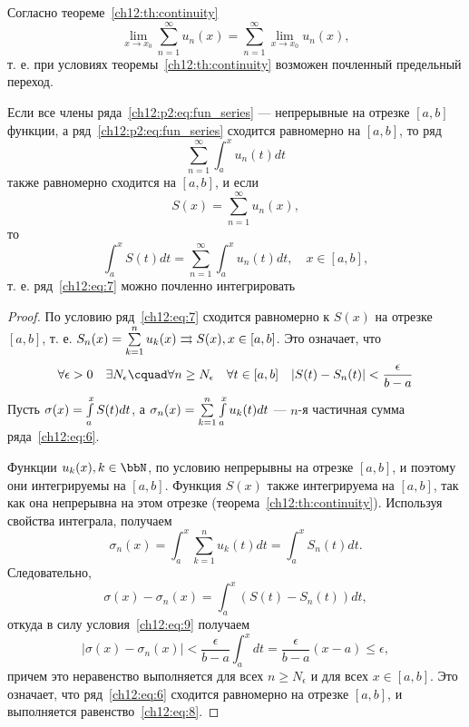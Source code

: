 \begin{cons}
	Согласно теореме~\ref{ch12:th:continuity}
	$$
		\lim_{x \to x_0} \sum_{n = 1}^{\infty} u_n(x) = \sum_{n = 1}^{\infty} \lim_{x \to x_0} u_n(x),
	$$
	т. е. при условиях теоремы~\eqref{ch12:th:continuity} возможен почленный предельный переход.
\end{cons}


\begin{thm}
	\label{ch12:th:integration}
	Если все члены ряда~\eqref{ch12:p2:eq:fun_series} --- непрерывные на отрезке $[a, b]$ функции,
	а ряд~\eqref{ch12:p2:eq:fun_series} сходится равномерно на $[a, b]$, то ряд
	\begin{equation}
		\label{ch12:eq:6}
		\sum_{n=1}^{\infty} \int_a^x u_n(t)dt
	\end{equation}
	также равномерно сходится на $[a, b]$, и если
	\begin{equation}
		\label{ch12:eq:7}
		S(x) = \sum_{n=1}^{\infty} u_n(x),
	\end{equation}
	то
	\begin{equation}
		\label{ch12:eq:8}
		\int_a^x S(t)dt = \sum_{n=1}^{\infty} \int_a^x u_n(t)dt, \quad x \in [a, b],
	\end{equation}
	т. е. ряд~\eqref{ch12:eq:7} можно почленно интегрировать
\end{thm}
\begin{proof}
	По условию ряд~\eqref{ch12:eq:7} сходится равномерно к $S(x)$ на отрезке $[a, b]$,
	т. е. $S_n(x) = \sum_{k=1}^{n}\limits u_k(x) \rightrightarrows S(x), x \in [a, b]$.
	Это означает, что
	\begin{equation}
		\label{ch12:eq:9}
		\forall \epsilon > 0 \quad \exists N_{\epsilon} \cquad \forall n \ge N_{\epsilon} \quad
			\forall t \in [a, b] \quad |S(t) - S_n(t)| < \frac{\epsilon}{b - a}
	\end{equation}
	Пусть $\sigma(x) = \int_a^x\limits S(t)dt$, а $\sigma_n(x) = \sum_{k=1}^n\limits \int_a^x\limits u_k(t)dt$ ---
	$n$-я частичная сумма ряда~\eqref{ch12:eq:6}.

	Функции $u_k(x), k \in \bbN$, по условию непрерывны на отрезке $[a, b]$, и поэтому
	они интегрируемы на $[a, b]$. Функция $S(x)$ также интегрируема на $[a, b]$, так как
	она непрерывна на этом отрезке (теорема~\ref{ch12:th:continuity}).
	Используя свойства интеграла, получаем
	$$
		\sigma_n(x) = \int_a^x \sum_{k=1}^n u_k(t)dt = \int_a^x S_n(t)dt.
	$$
	Следовательно,
	$$
		\sigma(x) - \sigma_n(x) = \int_a^x (S(t) - S_n(t))dt,
	$$
	откуда в силу условия~\eqref{ch12:eq:9} получаем
	$$
		|\sigma(x) - \sigma_n(x)| < \frac{\epsilon}{b - a} \int_a^x dt = \frac{\epsilon}{b - a} (x - a) \le \epsilon,
	$$
	причем это неравенство выполняется для всех $n \ge N_{\epsilon}$ и для всех $x \in [a, b]$.
	Это означает, что ряд~\eqref{ch12:eq:6} сходится равномерно на отрезке $[a, b]$,
	и выполняется равенство~\eqref{ch12:eq:8}.
\end{proof}


